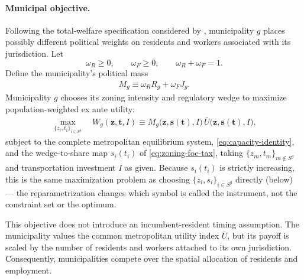 \documentclass[12pt, a4paper]{article}
\theoremstyle{definition}
\theoremstyle{remark}
\begin{document}
\paragraph{Municipal objective.}
Following the total-welfare specification considered by \citet{Bordeu2026-df}, municipality $g$ places possibly different political weights on residents and workers associated with its jurisdiction. Let
\[
\omega_R\geq0,
\qquad
\omega_F\geq0,
\qquad
\omega_R+\omega_F=1.
\]
Define the municipality's political mass
\begin{align}
    \label{eq:political-mass}
    M_g\equiv \omega_RR_g+\omega_FJ_g.
\end{align}
Municipality $g$ chooses its zoning intensity and regulatory wedge to maximize population-weighted ex ante utility:
\begin{align}
    \label{eq:municipal-problem}
    \max_{\{z_i,t_i\}_{i\in S^g}}
    \quad
    W_g(\mathbf z,\mathbf t,I)
    \equiv
    M_g\bigl(\mathbf z,\mathbf s(\mathbf t),I\bigr)\,
    \bar U\bigl(\mathbf z,\mathbf s(\mathbf t),I\bigr),
\end{align}
subject to the complete metropolitan equilibrium system, \eqref{eq:capacity-identity}, and the wedge-to-share map $s_i(t_i)$ of \eqref{eq:zoning-foc-tax}, taking $\{z_m,t_m\}_{m\notin S^g}$ and transportation investment $I$ as given. Because $s_i(t_i)$ is strictly increasing, this is the same maximization problem as choosing $\{z_i,s_i\}_{i\in S^g}$ directly (below) — the reparametrization changes which symbol is called the instrument, not the constraint set or the optimum.

This objective does not introduce an incumbent-resident timing assumption. The municipality values the common metropolitan utility index $\bar U$, but its payoff is scaled by the number of residents and workers attached to its own jurisdiction. Consequently, municipalities compete over the spatial allocation of residents and employment.
\end{document}
